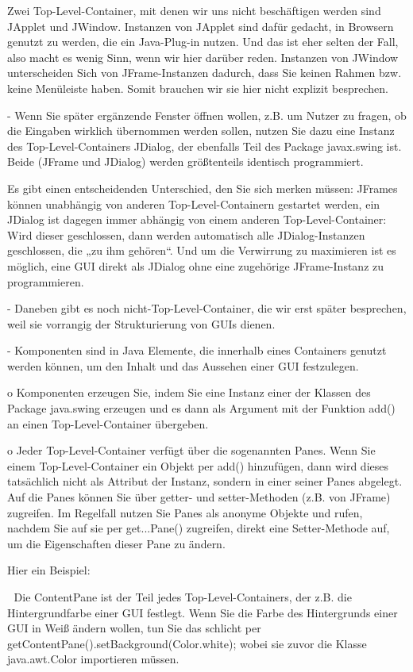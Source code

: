 Zwei Top-Level-Container, mit denen wir uns nicht beschäftigen werden sind JApplet und JWindow. Instanzen von JApplet sind dafür gedacht, in Browsern genutzt zu werden, die ein Java-Plug-in nutzen. Und das ist eher selten der Fall, also macht es wenig Sinn, wenn wir hier darüber reden. Instanzen von JWindow unterscheiden Sich von JFrame-Instanzen dadurch, dass Sie keinen Rahmen bzw. keine Menüleiste haben. Somit brauchen wir sie hier nicht explizit besprechen.

-	Wenn Sie später ergänzende Fenster öffnen wollen, z.B. um Nutzer zu fragen, ob die Eingaben wirklich übernommen werden sollen, nutzen Sie dazu eine Instanz des Top-Level-Containers JDialog, der ebenfalls Teil des Package javax.swing ist. Beide (JFrame und JDialog) werden größtenteils identisch programmiert.

Es gibt einen entscheidenden Unterschied, den Sie sich merken müssen: JFrames können unabhängig von anderen Top-Level-Containern gestartet werden, ein JDialog ist dagegen immer abhängig von einem anderen Top-Level-Container: Wird dieser geschlossen, dann werden automatisch alle JDialog-Instanzen geschlossen, die „zu ihm gehören“. Und um die Verwirrung zu maximieren ist es möglich, eine GUI direkt als JDialog ohne eine zugehörige JFrame-Instanz zu programmieren.

-	Daneben gibt es noch nicht-Top-Level-Container, die wir erst später besprechen, weil sie vorrangig der Strukturierung von GUIs dienen.

-	Komponenten sind in Java Elemente, die innerhalb eines Containers genutzt werden können, um den Inhalt und das Aussehen einer GUI festzulegen. 

o	Komponenten erzeugen Sie, indem Sie eine Instanz einer der Klassen des Package java.swing erzeugen und es dann als Argument mit der Funktion add() an einen Top-Level-Container übergeben.

o	Jeder Top-Level-Container verfügt über die sogenannten Panes. Wenn Sie einem Top-Level-Container ein Objekt per add() hinzufügen, dann wird dieses tatsächlich nicht als Attribut der Instanz, sondern in einer seiner Panes abgelegt. Auf die Panes können Sie über getter- und setter-Methoden (z.B. von JFrame) zugreifen. Im Regelfall nutzen Sie Panes als anonyme Objekte und rufen, nachdem Sie auf sie per get...Pane() zugreifen, direkt eine Setter-Methode auf, um die Eigenschaften dieser Pane zu ändern. 

Hier ein Beispiel:

	Die ContentPane ist der Teil jedes Top-Level-Containers, der z.B. die Hintergrundfarbe einer GUI festlegt. Wenn Sie die Farbe des Hintergrunds einer GUI in Weiß ändern wollen, tun Sie das schlicht per getContentPane().setBackground(Color.white); wobei sie zuvor die Klasse java.awt.Color importieren müssen.

